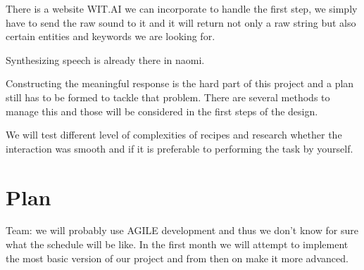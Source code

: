 \documentclass[11pt]{article} %
\begin{document}
There is a website WIT.AI we can incorporate to handle the first step, we simply have to send the raw sound to it and it will return not only a raw string but also certain entities and keywords we are looking for.

Synthesizing speech is already there in naomi. 

Constructing the meaningful response is the hard part of this project and a plan still has to be formed to tackle that problem. There are several methods to manage this and those will be considered in the first steps of the design.

We will test different level of complexities of recipes and research whether the interaction was smooth and if it is preferable to performing the task by yourself.

\section{Plan}
Team: we will probably use AGILE development and thus we don't know for sure what the schedule will be like. In the first month we will attempt to implement the most basic version of our project and from then on make it more advanced.
\end{document}
